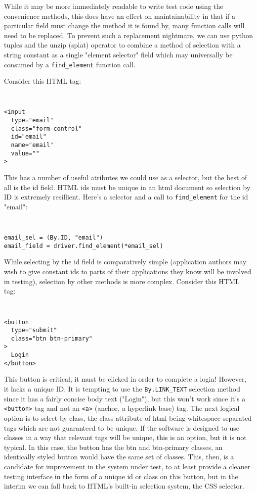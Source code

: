 While it may be more immediately readable to write test code using the convenience methods, this does have an effect on maintainability in that if a particular field must change the method it is found by, many function calls will need to be replaced. To prevent such a replacement nightmare, we can use python tuples and the unzip (splat) operator to combine a method of selection with a string constant as a single "element selector" field which may universally be consumed by a \texttt{find\_element} function call.

Consider this HTML tag:

{\tt
\begin{verbatim}
<input
  type="email"
  class="form-control"
  id="email"
  name="email"
  value=""
>
\end{verbatim}
}

This has a number of useful atributes we could use as a selector, but the best of all is the id field. HTML ids must be unique in an html document \citep{HTMLStan99} so selection by ID is extremely resillient. Here's a selector and a call to \texttt{find\_element} for the id "email":

{\tt
\begin{verbatim}
email_sel = (By.ID, "email")
email_field = driver.find_element(*email_sel)
\end{verbatim}
}

While selecting by the id field is comparatively simple (application authors may wish to give constant ids to parts of their applications they know will be involved in testing), selection by other methods is more complex. Consider this HTML tag:

{\tt
\begin{verbatim}
<button
  type="submit"
  class="btn btn-primary"
>
  Login
</button>
\end{verbatim}
}

This button is critical, it must be clicked in order to complete a login! However, it lacks a unique ID. It is tempting to use the \texttt{By.LINK\_TEXT} selection method since it has a fairly concise body text ("Login"), but this won't work since it's a \texttt{<button>} tag and not an \texttt{<a>} (anchor, a hyperlink base) tag. The next logical option is to select by class, the class attribute of html being whitespace-separated tags which are not guaranteed to be unique. If the software is designed to use classes in a way that relevant tags will be unique, this is an option, but it is not typical. In this case, the button has the btn and btn-primary classes, an identically styled button would have the same set of classes. This, then, is a candidate for improvement in the system under test, to at least provide a cleaner testing interface in the form of a unique id or class on this button, but in the interim we can fall back to HTML's built-in selection system, the CSS selector.

